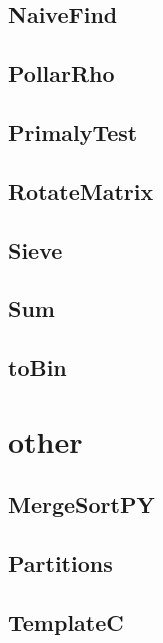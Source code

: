 \subsection{ NaiveFind}
\raggedbottom
\hrulefill
\subsection{ PollarRho}
\raggedbottom
\hrulefill
\subsection{ PrimalyTest}
\raggedbottom
\hrulefill
\subsection{ RotateMatrix}
\raggedbottom
\hrulefill
\subsection{ Sieve}
\raggedbottom
\hrulefill
\subsection{ Sum}
\raggedbottom
\hrulefill
\subsection{ toBin}
\raggedbottom
\hrulefill

\section{other}
\subsection{ MergeSortPY}
\raggedbottom
\hrulefill
\subsection{ Partitions}
\raggedbottom
\hrulefill
\subsection{ TemplateC}
\raggedbottom
\hrulefill
